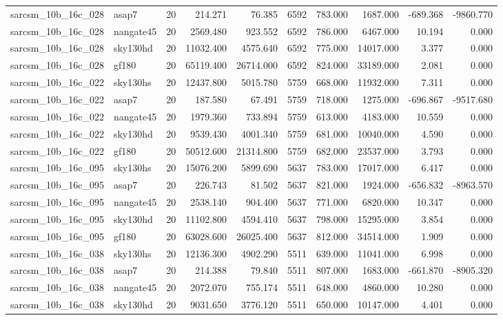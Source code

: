 \begin{tabular}{llrrrrrrrr}
sarcsm\_10b\_16c\_028 & asap7 & 20 & 214.271 & 76.385 & 6592 & 783.000 & 1687.000 & -689.368 & -9860.770 \\
sarcsm\_10b\_16c\_028 & nangate45 & 20 & 2569.480 & 923.552 & 6592 & 786.000 & 6467.000 & 10.194 & 0.000 \\
sarcsm\_10b\_16c\_028 & sky130hd & 20 & 11032.400 & 4575.640 & 6592 & 775.000 & 14017.000 & 3.377 & 0.000 \\
sarcsm\_10b\_16c\_028 & gf180 & 20 & 65119.400 & 26714.000 & 6592 & 824.000 & 33189.000 & 2.081 & 0.000 \\
sarcsm\_10b\_16c\_022 & sky130hs & 20 & 12437.800 & 5015.780 & 5759 & 668.000 & 11932.000 & 7.311 & 0.000 \\
sarcsm\_10b\_16c\_022 & asap7 & 20 & 187.580 & 67.491 & 5759 & 718.000 & 1275.000 & -696.867 & -9517.680 \\
sarcsm\_10b\_16c\_022 & nangate45 & 20 & 1979.360 & 733.894 & 5759 & 613.000 & 4183.000 & 10.559 & 0.000 \\
sarcsm\_10b\_16c\_022 & sky130hd & 20 & 9539.430 & 4001.340 & 5759 & 681.000 & 10040.000 & 4.590 & 0.000 \\
sarcsm\_10b\_16c\_022 & gf180 & 20 & 50512.600 & 21314.800 & 5759 & 682.000 & 23537.000 & 3.793 & 0.000 \\
sarcsm\_10b\_16c\_095 & sky130hs & 20 & 15076.200 & 5899.690 & 5637 & 783.000 & 17017.000 & 6.417 & 0.000 \\
sarcsm\_10b\_16c\_095 & asap7 & 20 & 226.743 & 81.502 & 5637 & 821.000 & 1924.000 & -656.832 & -8963.570 \\
sarcsm\_10b\_16c\_095 & nangate45 & 20 & 2538.140 & 904.400 & 5637 & 771.000 & 6820.000 & 10.347 & 0.000 \\
sarcsm\_10b\_16c\_095 & sky130hd & 20 & 11102.800 & 4594.410 & 5637 & 798.000 & 15295.000 & 3.854 & 0.000 \\
sarcsm\_10b\_16c\_095 & gf180 & 20 & 63028.600 & 26025.400 & 5637 & 812.000 & 34514.000 & 1.909 & 0.000 \\
sarcsm\_10b\_16c\_038 & sky130hs & 20 & 12136.300 & 4902.290 & 5511 & 639.000 & 11041.000 & 6.998 & 0.000 \\
sarcsm\_10b\_16c\_038 & asap7 & 20 & 214.388 & 79.840 & 5511 & 807.000 & 1683.000 & -661.870 & -8905.320 \\
sarcsm\_10b\_16c\_038 & nangate45 & 20 & 2072.070 & 755.174 & 5511 & 648.000 & 4860.000 & 10.280 & 0.000 \\
sarcsm\_10b\_16c\_038 & sky130hd & 20 & 9031.650 & 3776.120 & 5511 & 650.000 & 10147.000 & 4.401 & 0.000 \\

\end{tabular}
